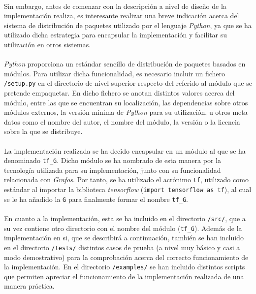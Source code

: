 \documentclass{subfiles}
\begin{document}
        \paragraph{}
        Sin embargo, antes de comenzar con la descripción a nivel de diseño de la implementación realiza, es interesante realizar una breve indicación acerca del sistema de distribución de paquetes utilizado por el lenguaje \emph{Python}, ya que se ha utilizado dicha estrategia para encapsular la implementación y facilitar su utilización en otros sistemas.

        \paragraph{}
        \emph{Python} proporciona un estándar sencillo de distribución de paquetes basados en módulos. Para utilizar dicha funcionalidad, es necesario incluir un fichero \texttt{/setup.py} en el directorio de nivel superior respecto del referido al módulo que se pretende empaquetar. En dicho fichero se anotan distintos valores acerca del módulo, entre las que se encuentran su localización, las dependencias sobre otros módulos externos, la versión mínima de \emph{Python} para su utilización, u otros meta-datos como el nombre del autor, el nombre del módulo, la versión o la licencia sobre la que se distribuye.

        \paragraph{}
        La implementación realizada se ha decido encapsular en un módulo al que se ha denominado \texttt{tf\_G}. Dicho módulo se ha nombrado de esta manera por la tecnología utilizada para su implementación, junto con su funcionalidad relacionada con \emph{Grafos}. Por tanto, se ha utilizado el acrónimo \texttt{tf}, utilizado como estándar al importar la biblioteca \emph{tensorflow} (\texttt{import tensorflow as tf}), al cual se le ha añadido la \texttt{G} para finalmente formar el nombre \texttt{tf\_G}.

        \paragraph{}
        En cuanto a la implementación, esta se ha incluido en el directorio \texttt{/src/}, que a su vez contiene otro directorio con el nombre del módulo (\texttt{tf\_G}). Además de la implementación en si, que se describirá a continuación, también se han incluido en el directorio \texttt{/tests/} distintos casos de prueba (a nivel muy básico y casi a modo demostrativo) para la comprobación acerca del correcto funcionamiento de la implementación. En el directorio \texttt{/examples/} se han incluido distintos scripts que permiten apreciar el funcionamiento de la implementación realizada de una manera práctica.
\end{document}
